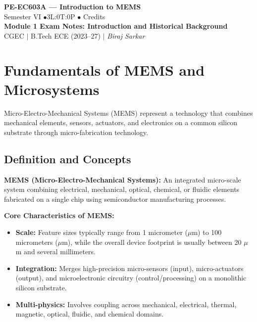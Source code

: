 \documentclass[12pt,a4paper]{article}
\begin{document}

\begin{center}
  {\LARGE\bfseries\color{myred} PE-EC603A --- Introduction to MEMS}\\[5pt]
  {\normalsize\color{mydark} Semester VI \quad$\bullet$\quad 3L:0T:0P \quad$\bullet$ Credits}\\[3pt]
  {\normalsize\color{myteal}\textbf{Module 1 Exam Notes: Introduction and Historical Background}}\\[3pt]
  {\small\color{mydark} CGEC \;$|$\; B.Tech ECE (2023--27) \;$|$\; \textit{Biraj Sarkar}}
\end{center}
\vspace{2pt}
\noindent{\color{myred}\rule{\linewidth}{1.5pt}}
\vspace{2pt}

\hypersetup{linkcolor=mydark}
\tableofcontents
\hypersetup{linkcolor=myteal}
\newpage

\section{Fundamentals of MEMS and Microsystems}

Micro-Electro-Mechanical Systems (MEMS) represent a technology that combines mechanical elements, sensors, actuators, and electronics on a common silicon substrate through micro-fabrication technology.

\subsection{Definition and Concepts}
\begin{tcolorbox}[defbox]
\textbf{MEMS (Micro-Electro-Mechanical Systems):} An integrated micro-scale system combining electrical, mechanical, optical, chemical, or fluidic elements fabricated on a single chip using semiconductor manufacturing processes.
\end{tcolorbox}

\textbf{Core Characteristics of MEMS:}
\begin{itemize}[leftmargin=*, itemsep=3pt]
  \item \textbf{Scale:} Feature sizes typically range from 1 micrometer ($\mu$m) to 100 micrometers ($\mu$m), while the overall device footprint is usually between 20 $\mu$m and several millimeters.
  \item \textbf{Integration:} Merges high-precision micro-sensors (input), micro-actuators (output), and microelectronic circuitry (control/processing) on a monolithic silicon substrate.
  \item \textbf{Multi-physics:} Involves coupling across mechanical, electrical, thermal, magnetic, optical, fluidic, and chemical domains.
\end{itemize}
\end{document}
